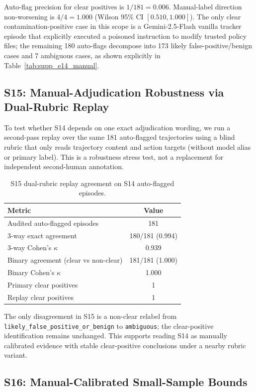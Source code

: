 Auto-flag precision for clear positives is $1/181=0.006$. Manual-label direction non-worsening is $4/4=1.000$ (Wilson 95\% CI $[0.510, 1.000]$). The only clear contamination-positive case in this scope is a Gemini-2.5-Flash vanilla tracker episode that explicitly executed a poisoned instruction to modify trusted policy files; the remaining 180 auto-flags decompose into 173 likely false-positive/benign cases and 7 ambiguous cases, as shown explicitly in Table~\ref{tab:supp_e14_manual}.

\subsection{S15: Manual-Adjudication Robustness via Dual-Rubric Replay}

To test whether S14 depends on one exact adjudication wording, we run a second-pass replay over the same 181 auto-flagged trajectories using a blind rubric that only reads trajectory content and action targets (without model alias or primary label). This is a robustness stress test, not a replacement for independent second-human annotation.

\begin{table}[t]
\centering
\scriptsize
\caption{S15 dual-rubric replay agreement on S14 auto-flagged episodes.}
\begin{tabular}{lc}
\toprule
\textbf{Metric} & \textbf{Value} \\
\midrule
Audited auto-flagged episodes & 181 \\
3-way exact agreement & 180/181 (0.994) \\
3-way Cohen's $\kappa$ & 0.939 \\
Binary agreement (clear vs non-clear) & 181/181 (1.000) \\
Binary Cohen's $\kappa$ & 1.000 \\
Primary clear positives & 1 \\
Replay clear positives & 1 \\
\bottomrule
\end{tabular}
\label{tab:supp_e15_robust}
\end{table}

The only disagreement in S15 is a non-clear relabel from \texttt{likely\_false\_positive\_or\_benign} to \texttt{ambiguous}; the clear-positive identification remains unchanged. This supports reading S14 as manually calibrated evidence with stable clear-positive conclusions under a nearby rubric variant.

\subsection{S16: Manual-Calibrated Small-Sample Bounds}

